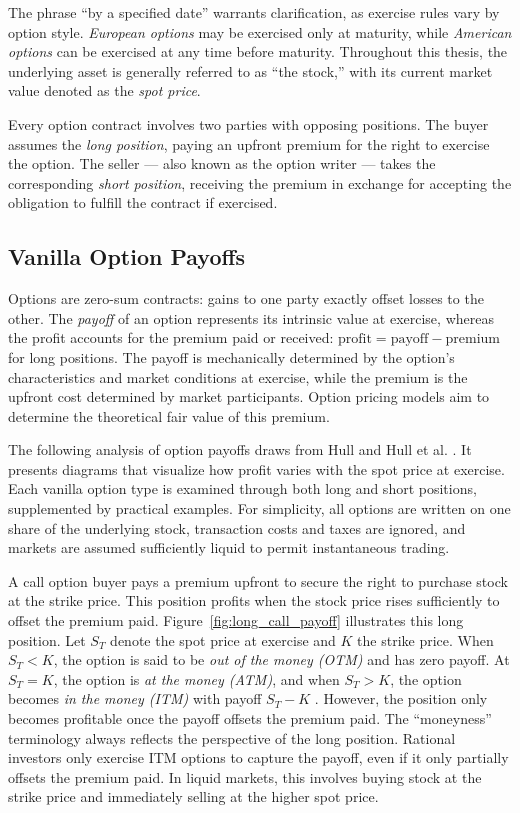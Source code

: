 \documentclass[english,12pt,a4paper,pdftex,sci,utf8]{aaltothesis}
\begin{document}
The phrase ``by a specified date'' warrants clarification, as exercise rules vary by option style. \emph{European options} may be exercised only at maturity, while \emph{American options} can be exercised at any time before maturity. Throughout this thesis, the underlying asset is generally referred to as ``the stock,'' with its current market value denoted as the \emph{spot price}.

Every option contract involves two parties with opposing positions. The buyer assumes the \emph{long position}, paying an upfront premium for the right to exercise the option. The seller --- also known as the option writer --- takes the corresponding \emph{short position}, receiving the premium in exchange for accepting the obligation to fulfill the contract if exercised.

\clearpage
\subsection{Vanilla Option Payoffs}\label{subsec:payoffs}

Options are zero-sum contracts: gains to one party exactly offset losses to the other. The \emph{payoff} of an option represents its intrinsic value at exercise, whereas the profit accounts for the premium paid or received: \mbox{$\text{profit} = \text{payoff} - \text{premium}$} for long positions. The payoff is mechanically determined by the option's characteristics and market conditions at exercise, while the premium is the upfront cost determined by market participants. Option pricing models aim to determine the theoretical fair value of this premium.

The following analysis of option payoffs draws from Hull \cite{hull2016options} and Hull et al. \cite{hull2013fundamentals}. It presents diagrams that visualize how profit varies with the spot price at exercise. Each vanilla option type is examined through both long and short positions, supplemented by practical examples. For simplicity, all options are written on one share of the underlying stock, transaction costs and taxes are ignored, and markets are assumed sufficiently liquid to permit instantaneous trading.

A call option buyer pays a premium upfront to secure the right to purchase stock at the strike price. This position profits when the stock price rises sufficiently to offset the premium paid. Figure~\ref{fig:long_call_payoff} illustrates this long position. Let $S_T$ denote the spot price at exercise and $K$ the strike price. When $S_T < K$, the option is said to be \emph{out of the money (OTM)} and has zero payoff. At $S_T = K$, the option is \emph{at the money (ATM)}, and when $S_T > K$, the option becomes \emph{in the money (ITM)} with payoff $S_T - K$ \cite{hull2013fundamentals}. However, the position only becomes profitable once the payoff offsets the premium paid. The ``moneyness'' terminology always reflects the perspective of the long position. Rational investors only exercise ITM options to capture the payoff, even if it only partially offsets the premium paid. In liquid markets, this involves buying stock at the strike price and immediately selling at the higher spot price.
\end{document}
